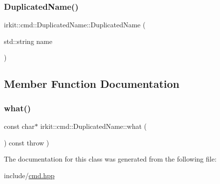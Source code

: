 \subsubsection{\texorpdfstring{Duplicated\+Name()}{DuplicatedName()}}
{\footnotesize\ttfamily irkit\+::cmd\+::\+Duplicated\+Name\+::\+Duplicated\+Name (\begin{DoxyParamCaption}\item[{std\+::string}]{name }\end{DoxyParamCaption})\hspace{0.3cm}{\ttfamily [inline]}}



\subsection{Member Function Documentation}
\mbox{\label{classirkit_1_1cmd_1_1DuplicatedName_ac6e2ef55f050af443892cc165ee94953}} 
\subsubsection{\texorpdfstring{what()}{what()}}
{\footnotesize\ttfamily const char$\ast$ irkit\+::cmd\+::\+Duplicated\+Name\+::what (\begin{DoxyParamCaption}{ }\end{DoxyParamCaption}) const throw  ) \hspace{0.3cm}{\ttfamily [inline]}}



The documentation for this class was generated from the following file\+:\begin{DoxyCompactItemize}
\item 
include/\mbox{\hyperlink{cmd_8hpp}{cmd.\+hpp}}\end{DoxyCompactItemize}
